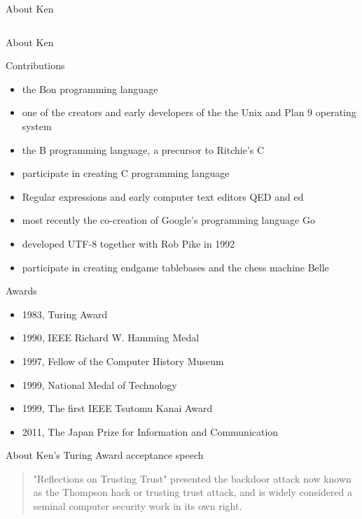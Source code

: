 \documentclass[CJK]{beamer}
\begin{document}
\begin{CJK*}{UTF8}{gbsn}
\begin{frame}{About Ken}
\begin{columns}
\begin{itemize}
		\end{itemize}
\end{columns}
\end{frame}
{\tiny
\begin{frame}{About Ken}
	\begin{block}{Contributions}
		\begin{itemize}
			\item the Bon programming language
			\item one of the creators and early developers of the the Unix and Plan 9 operating system
			\item the B programming language, a precursor to Ritchie's C
			\item participate in  creating C programming language
			\item Regular expressions and early computer text editors QED and ed
			\item most recently the co-creation of Google's programming language Go
			\item developed UTF-8 together with Rob Pike in 1992
			\item participate in creating endgame tablebases and the chess machine Belle
		\end{itemize}
	\end{block}
	\begin{block}{Awards}	
		\begin{itemize}
			\item 1983, Turing Award
			\item 1990, IEEE Richard W. Hamming Medal
			\item 1997, Fellow of the Computer History Museum
			\item 1999, National Medal of Technology
			\item 1999, The first IEEE Tsutomu Kanai Award
			\item 2011, The Japan Prize for Information and Communication
		\end{itemize}
	\end{block}
\end{frame}
}
\begin{frame}{About Ken's Turing Award acceptance speech}
	\begin{quote}
	"Reflections on Trusting Trust" presented the backdoor attack now known as the {\color{red} Thompson hack} or {\color{red} trusting trust attack}, and is widely considered a seminal computer security work in its own right.
	\end{quote}
	\begin{flushright}

\end{flushright}
\end{frame}
\end{CJK*}
\end{document}
